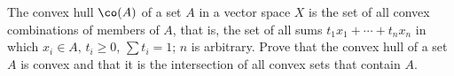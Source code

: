 % 
% 
\begin{exerciseStatement}
The convex hull $\co(A)$ of a set $A$ in a vector space $X$ is the set of all convex combinations of members of $A$, that is, %
the set of all sums $t_1 x_1 +\cdots +t_n x_n$ in which $x_i \in A,\, t_i \geq 0$, $\sum t_i = 1$; $n$ is arbitrary. Prove %
that the convex hull of a set $A$ is convex and that it is the intersection of all convex sets that contain $A$.
\end{exerciseStatement}
% 
